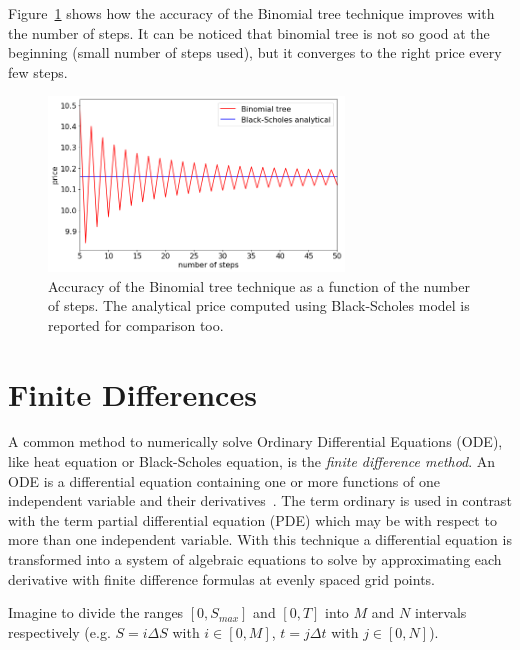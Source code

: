 Figure~\ref{fig:binomial_tree_accuracy} shows how the accuracy of the Binomial tree technique improves with the number of steps.
It can be noticed that binomial tree is not so good at the beginning (small number of steps used), but it converges to the right price every few steps. 

\begin{figure}[htb]
	\centering
	\includegraphics[width=0.7\textwidth]{figures/binomial_tree_accuracy}
	\caption{Accuracy of the Binomial tree technique as a function of the number of steps. The analytical price computed using Black-Scholes model is reported for comparison too.}
	\label{fig:binomial_tree_accuracy}
\end{figure} 

\section{Finite Differences} 
\label{sec:finite_difference}
A common method to numerically solve Ordinary Differential Equations (ODE), like heat equation or Black-Scholes equation, is the \emph{finite difference method}. An ODE is a differential equation containing one or more functions of one independent variable and their derivatives~\cite{bib:ode}. The term ordinary is used in contrast with the term partial differential equation (PDE) which may be with respect to more than one independent variable.
With this technique a differential equation is transformed into a system of algebraic equations to solve by approximating each derivative with finite difference formulas at evenly spaced grid points.

Imagine to divide the ranges $[0, S_{max}]$ and $[0, T]$ into $M$ and $N$ intervals respectively (e.g. $S = i\Delta S$ with $i\in[0, M]$, $t = j\Delta t$ with $j \in[0,N]$).

